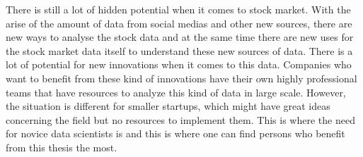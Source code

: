 
There is still a lot of hidden potential when it comes to stock market.
With the arise of the amount of data from social medias and other new sources, there are new ways to analyse the stock data and at the same time there are new uses for the stock market data itself to understand these new sources of data.
There is a lot of potential for new innovations when it comes to this data.
Companies who want to benefit from these kind of innovations have their own highly professional teams that have resources to analyze this kind of data in large scale.
However, the situation is different for smaller startups, which might have great ideas concerning the field but no resources to implement them.
This is where the need for novice data scientists is and this is where one can find persons who benefit from this thesis the most.

